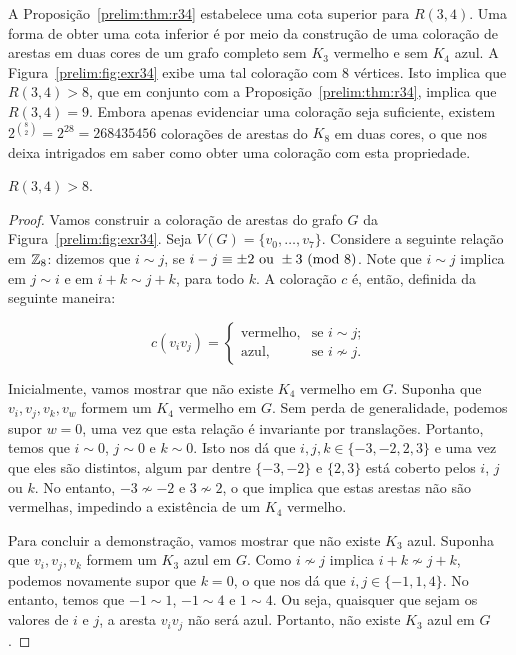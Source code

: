 A Proposição~\ref{prelim:thm:r34} estabelece uma cota superior para $R(3,4)$. Uma forma de obter uma cota inferior é por meio da construção de uma coloração de arestas em duas cores de um grafo completo sem $K_3$ vermelho e sem $K_4$ azul.
A Figura~\ref{prelim:fig:exr34} exibe uma tal coloração com 8 vértices. Isto implica que $R(3,4) > 8$, que em conjunto com a Proposição~\ref{prelim:thm:r34}, implica que $R(3,4) = 9$. Embora apenas evidenciar uma coloração seja suficiente, existem $2^{\binom{8}{2}} = 2^{28} = 268435456$ colorações de arestas do $K_8$ em duas cores, o que nos deixa intrigados em saber como obter uma coloração com esta propriedade.

\begin{proposition}
\label{prelim:thm:exr34}
$R(3,4) > 8$.
\end{proposition}
\begin{proof}
Vamos construir a coloração de arestas do grafo $G$ da Figura~\ref{prelim:fig:exr34}. Seja $V(G) = \{ v_0, \dots, v_7 \}$. Considere a  seguinte relação em $\mathbb{Z}_{8}$: dizemos que $i \sim j$, se $ i - j \equiv \pm 2 \text{ ou } \pm 3 \ (\text{mod}\ 8)$.
Note que $i \sim j$ implica em $ j \sim i$ e em $i + k \sim j + k$, para todo $k$. A coloração $c$ é, então, definida da seguinte maneira:

\[c(v_i v_j) = \begin{cases}
  \text{vermelho}, & \text{se } i \sim j; \\
  \text{azul}, & \text{se } i \not\sim j.
\end{cases}\]

Inicialmente, vamos mostrar que não existe $K_4$ vermelho em $G$. Suponha que $v_i, v_j, v_k, v_w$ formem um $K_4$ vermelho em $G$. Sem perda de generalidade, podemos supor $w = 0$, uma vez que esta relação é invariante por translações. Portanto, temos que $i \sim 0$, $j \sim 0$ e $k \sim 0$. Isto nos dá que $i,j,k \in \{-3,-2,2,3\}$ e uma vez que eles são distintos, algum par dentre $\{-3,-2\}$ e $\{2,3\}$ está coberto pelos $i$, $j$ ou $k$.
No entanto, $-3 \not\sim -2$ e $3 \not\sim 2$, o que implica que estas arestas não são vermelhas, impedindo a existência de um $K_4$ vermelho.

Para concluir a demonstração, vamos mostrar que não existe $K_3$ azul. Suponha que $v_i, v_j, v_k$ formem um $K_3$ azul em $G$. Como $i \not\sim j$ implica $i + k \not\sim j + k$, podemos novamente supor que $k = 0$, o que nos dá que $i,j \in \{-1,1,4\}$.
No entanto, temos que $-1 \sim 1$, $-1 \sim 4$ e $1 \sim 4$. Ou seja, quaisquer que sejam os valores de $i$ e $j$, a aresta $v_iv_j$ não será azul. Portanto, não existe $K_3$ azul em $G$.
\end{proof}

